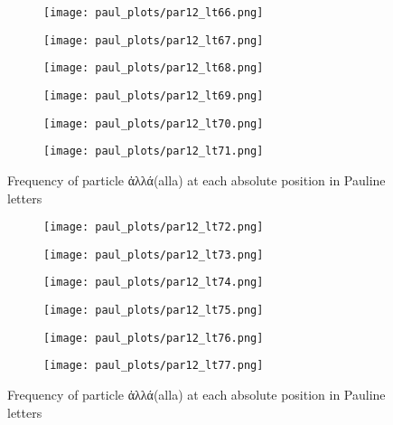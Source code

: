 \documentclass[a4paper]{article}
\begin{document}
\begin{figure}
\begin{subfigure}{0.45\textwidth}
\centering
\texttt{[image: paul\_plots/par12\_lt66.png]}
\end{subfigure}
\begin{subfigure}{0.45\textwidth}
\centering
\texttt{[image: paul\_plots/par12\_lt67.png]}
\end{subfigure}
\begin{subfigure}{0.45\textwidth}
\centering
\texttt{[image: paul\_plots/par12\_lt68.png]}
\end{subfigure}
\begin{subfigure}{0.45\textwidth}
\centering
\texttt{[image: paul\_plots/par12\_lt69.png]}
\end{subfigure}
\begin{subfigure}{0.45\textwidth}
\centering
\texttt{[image: paul\_plots/par12\_lt70.png]}
\end{subfigure}
\begin{subfigure}{0.45\textwidth}
\centering
\texttt{[image: paul\_plots/par12\_lt71.png]}
\end{subfigure}
\caption{Frequency of particle \textgreek{ἀλλά}(alla) at each absolute position in Pauline letters}
\label{paul_akka}
\end{figure}

\begin{figure}
\ContinuedFloat
\begin{subfigure}{0.45\textwidth}
\centering
\texttt{[image: paul\_plots/par12\_lt72.png]}
\end{subfigure}
\begin{subfigure}{0.45\textwidth}
\centering
\texttt{[image: paul\_plots/par12\_lt73.png]}
\end{subfigure}
\begin{subfigure}{0.45\textwidth}
\centering
\texttt{[image: paul\_plots/par12\_lt74.png]}
\end{subfigure}
\begin{subfigure}{0.45\textwidth}
\centering
\texttt{[image: paul\_plots/par12\_lt75.png]}
\end{subfigure}
\begin{subfigure}{0.45\textwidth}
\centering
\texttt{[image: paul\_plots/par12\_lt76.png]}
\end{subfigure}
\begin{subfigure}{0.45\textwidth}
\centering
\texttt{[image: paul\_plots/par12\_lt77.png]}
\end{subfigure}
\caption{Frequency of particle \textgreek{ἀλλά}(alla) at each absolute position in Pauline letters}
\end{figure}
\end{document}

